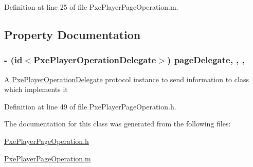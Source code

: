 Definition at line 25 of file Pxe\-Player\-Page\-Operation.\-m.



\subsection{Property Documentation}
\hypertarget{interface_pxe_player_page_operation_a57ec43b30a26ea1b04081f9ed0b7d9a4}{
\subsubsection[{page\-Delegate}]{\setlength{\rightskip}{0pt plus 5cm}-\/ (id$<${\bf Pxe\-Player\-Operation\-Delegate}$>$) page\-Delegate\hspace{0.3cm}{\ttfamily [read]}, {\ttfamily [write]}, {\ttfamily [nonatomic]}, {\ttfamily [weak]}}}\label{interface_pxe_player_page_operation_a57ec43b30a26ea1b04081f9ed0b7d9a4}
A \hyperlink{protocol_pxe_player_operation_delegate-p}{Pxe\-Player\-Operation\-Delegate} protocol instance to send information to class which implements it 

Definition at line 49 of file Pxe\-Player\-Page\-Operation.\-h.



The documentation for this class was generated from the following files\-:\begin{DoxyCompactItemize}
\item 
\hyperlink{_pxe_player_page_operation_8h}{Pxe\-Player\-Page\-Operation.\-h}\item 
\hyperlink{_pxe_player_page_operation_8m}{Pxe\-Player\-Page\-Operation.\-m}\end{DoxyCompactItemize}
